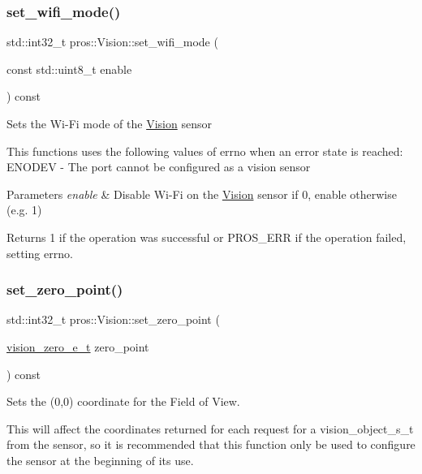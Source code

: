 \subsubsection{\texorpdfstring{set\+\_\+wifi\+\_\+mode()}{set\_wifi\_mode()}}
{\footnotesize\ttfamily std\+::int32\+\_\+t pros\+::\+Vision\+::set\+\_\+wifi\+\_\+mode (\begin{DoxyParamCaption}\item[{const std\+::uint8\+\_\+t}]{enable }\end{DoxyParamCaption}) const}

Sets the Wi-\/\+Fi mode of the \hyperlink{classpros_1_1Vision}{Vision} sensor

This functions uses the following values of errno when an error state is reached\+: E\+N\+O\+D\+EV -\/ The port cannot be configured as a vision sensor


\begin{DoxyParams}{Parameters}
{\em enable} & Disable Wi-\/\+Fi on the \hyperlink{classpros_1_1Vision}{Vision} sensor if 0, enable otherwise (e.\+g. 1)\\
\hline
\end{DoxyParams}
\begin{DoxyReturn}{Returns}
1 if the operation was successful or P\+R\+O\+S\+\_\+\+E\+RR if the operation failed, setting errno. 
\end{DoxyReturn}
\mbox{\label{classpros_1_1Vision_a89e0a23b112b8632171ef27cc6f57a6c}} 
\subsubsection{\texorpdfstring{set\+\_\+zero\+\_\+point()}{set\_zero\_point()}}
{\footnotesize\ttfamily std\+::int32\+\_\+t pros\+::\+Vision\+::set\+\_\+zero\+\_\+point (\begin{DoxyParamCaption}\item[{\hyperlink{vision_8h_a2e8bc1c48f8aab12275bfc1868fbbad6}{vision\+\_\+zero\+\_\+e\+\_\+t}}]{zero\+\_\+point }\end{DoxyParamCaption}) const}

Sets the (0,0) coordinate for the Field of View.

This will affect the coordinates returned for each request for a vision\+\_\+object\+\_\+s\+\_\+t from the sensor, so it is recommended that this function only be used to configure the sensor at the beginning of its use.

